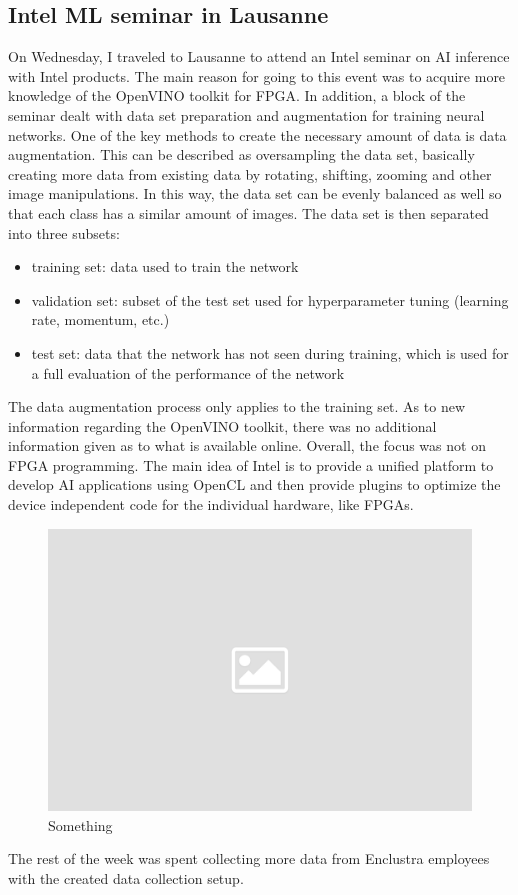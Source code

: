 \subsection{Intel \acs{ML} seminar in Lausanne}
On Wednesday, I traveled to Lausanne to attend an Intel seminar on \ac{AI} inference with Intel products. The main reason for going to this event was to acquire more knowledge of the OpenVINO toolkit for \ac{FPGA}. In addition, a block of the seminar dealt with data set preparation and augmentation for training neural networks. One of the key methods to create the necessary amount of data is data augmentation. This can be described as oversampling the data set, basically creating more data from existing data by rotating, shifting, zooming and other image manipulations. In this way, the data set can be evenly balanced as well so that each class has a similar amount of images. The data set is then separated into three subsets:
\begin{itemize}
	\item training set: data used to train the network
	\item validation set: subset of the test set used for hyperparameter tuning (learning rate, momentum, etc.)
	\item test set: data that the network has not seen during training, which is used for a full evaluation of the performance of the network
\end{itemize}
The data augmentation process only applies to the training set. As to new information regarding the OpenVINO toolkit, there was no additional information given as to what is available online. Overall, the focus was not on \ac{FPGA} programming. The main idea of Intel is to provide a unified platform to develop \ac{AI} applications using OpenCL and then provide plugins to optimize the device independent code for the individual hardware, like \acp{FPGA}.
\begin{figure}[!htb]
	\centering
		\includegraphics[width=\textwidth]{bilder/placeholder.png}
		\caption{Something}
		\label{fig:something}
\end{figure}
The rest of the week was spent collecting more data from Enclustra employees with the created data collection setup.

